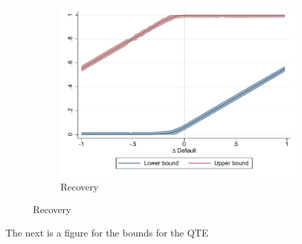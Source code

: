 \documentclass[oneside,11pt]{article}
\begin{document}
\begin{figure}[H]
\begin{center}
    \begin{subfigure}{0.475\textwidth}
        \caption{Recovery}
        \centering
        \includegraphics[width=\textwidth]{Figuras/fan_park_bounds_des_c.pdf}
    \end{subfigure}    
    \end{center}
\end{figure}


The next is a figure for the bounds for the QTE
\end{document}
